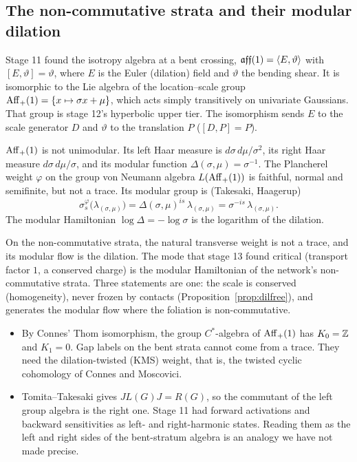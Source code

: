 \subsection{The non-commutative strata and their modular dilation}
\begin{theorem}\label{thm:affiso}
Stage 11 found the isotropy algebra at a bent crossing, $\mathfrak{aff}(1)=\langle E,\vartheta\rangle$ with $[E,\vartheta]=\vartheta$, where $E$ is the Euler (dilation) field
and $\vartheta$ the bending shear. It is isomorphic to the Lie algebra of the location--scale group $\mathrm{Aff}_+(1)=\{x\mapsto\sigma x+\mu\}$, which acts
simply transitively on univariate Gaussians. That group is stage 12's hyperbolic upper tier. The isomorphism sends $E$ to the
scale generator $D$ and $\vartheta$ to the translation $P$ ($[D,P]=P$).
\end{theorem}
\begin{theorem}\label{thm:modular}
$\mathrm{Aff}_+(1)$ is not unimodular. Its left Haar measure is $d\sigma\,d\mu/\sigma^2$, its right Haar measure $d\sigma\,d\mu/\sigma$, and its modular
function $\Delta(\sigma,\mu)=\sigma^{-1}$. The Plancherel weight $\varphi$ on the group von Neumann algebra $L(\mathrm{Aff}_+(1))$ is faithful, normal and
semifinite, but not a trace. Its modular group is (Takesaki, Haagerup)
\[
\sigma^\varphi_s\big(\lambda_{(\sigma,\mu)}\big)=\Delta(\sigma,\mu)^{is}\,\lambda_{(\sigma,\mu)}=\sigma^{-is}\,\lambda_{(\sigma,\mu)} .
\]
The modular Hamiltonian $\log\Delta=-\log\sigma$ is the logarithm of the dilation.
\end{theorem}
\begin{corollary}
On the non-commutative strata, the natural transverse weight is not a trace, and its modular flow is the dilation. The mode that
stage 13 found critical (transport factor $1$, a conserved charge) is the modular Hamiltonian of the network's non-commutative
strata. Three statements are one: the scale is conserved (homogeneity), never frozen by contacts (Proposition~\ref{prop:dilfree}), and
generates the modular flow where the foliation is non-commutative.
\end{corollary}
\begin{remark}
\begin{itemize}[leftmargin=*]
\item By Connes' Thom isomorphism, the group $C^*$-algebra of $\mathrm{Aff}_+(1)$ has $K_0=\mathbb Z$ and $K_1=0$. Gap labels on the bent strata cannot
come from a trace. They need the dilation-twisted (KMS) weight, that is, the twisted cyclic cohomology of Connes and Moscovici.
\item Tomita--Takesaki gives $JL(G)J=R(G)$, so the commutant of the left group algebra is the right one. Stage 11 had forward activations
and backward sensitivities as left- and right-harmonic states. Reading them as the left and right sides of the bent-stratum algebra is
an analogy we have not made precise.
\end{itemize}
\end{remark}

